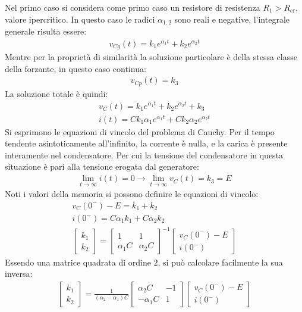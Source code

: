 \documentclass{article}
\numberwithin{equation}{subsection}
\begin{document}
Nel primo caso si considera come primo caso un resistore di resistenza $R_1>R_{\mathrm{cr}}$, valore ipercritico. In questo caso le radici $\alpha_{1,2}$ sono reali e negative, l'integrale generale 
risulta essere:
\begin{gather*}
    v_{Cg}(t)=k_1e^{\alpha_1t}+k_2e^{\alpha_2t}
\end{gather*}
Mentre per la proprietà di similarità la soluzione particolare è della stessa classe della forzante, in questo caso continua:
\begin{gather*}
    v_{Cp}(t)=k_3
\end{gather*}
La soluzione totale è quindi:
\begin{gather}
    v_C(t)=k_1e^{\alpha_1t}+k_2e^{\alpha_2t}+k_3\\
    i(t)=Ck_1\alpha_1e^{\alpha_1t}+Ck_2\alpha_2e^{\alpha_2t}
\end{gather}
Si esprimono le equazioni di vincolo del problema di Cauchy. Per il tempo tendente asintoticamente all'infinito, la corrente è nulla, e la carica è presente interamente nel 
condensatore. Per cui la tensione del condensatore in questa situazione è pari alla tensione erogata dal generatore: 
\begin{gather*}
    \lim_{t\to\infty}i(t)=0\rightarrow \lim_{t\to\infty}v_C(t)=k_3=E
\end{gather*}
Noti i valori della memoria si possono definire le equazioni di vincolo:
\begin{gather*}
    v_C(0^-)-E=k_1+k_2\\
    i(0^-)=C\alpha_1k_1+C\alpha_2k_2\\
    \begin{bmatrix}
        k_1\\k_2
    \end{bmatrix}=\begin{bmatrix}
        1&1\\\alpha_1C&\alpha_2C
    \end{bmatrix}^{-1}\begin{bmatrix}
        v_C(0^-)-E\\i(0^-)
    \end{bmatrix}
\end{gather*}
Essendo una matrice quadrata di ordine $2$, si può calcolare facilmente la sua inversa:
\begin{gather*}
    \begin{bmatrix}
        k_1\\k_2
    \end{bmatrix}=\displaystyle\frac{1}{(\alpha_2-\alpha_1)C}\begin{bmatrix}
        \alpha_2C&-1\\-\alpha_1C&1
    \end{bmatrix}\begin{bmatrix}
        v_C(0^-)-E\\i(0^-)
    \end{bmatrix}
\end{gather*}
\end{document}

